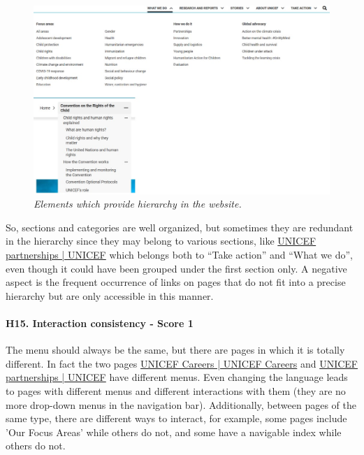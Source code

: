 \begin{figure}[!h]
	\begin{center}
		\includegraphics[width=\textwidth]{FinalScores18.jpg}
		\captionsetup{font=small}
		\caption{\textit{Elements which provide hierarchy in the website.}}
	\end{center}
\end{figure}
\newline
So, sections and categories are well organized, but sometimes they are redundant in the hierarchy since they may belong to various sections, like \href{https://www.unicef.org/partnerships}{UNICEF partnerships | UNICEF} which belongs both to “Take action” and “What we do”, even though it could have been grouped under the first section only. 
\newline A negative aspect is the frequent occurrence of links on pages that do not fit into a precise hierarchy but are only accessible in this manner.
\newline
\newline \paragraph{H15. Interaction consistency - Score 1}	\label{subsec:H15}The menu should always be the same, but there are pages in which it is totally different. In fact the two pages \href{https://www.unicef.org/careers/}{UNICEF Careers | UNICEF Careers} and \href{https://www.unicef.org/partnerships}{UNICEF partnerships | UNICEF} have different menus. Even changing the language leads to pages with different menus and different interactions with them (they are no more drop-down menus in the navigation bar).
\newline Additionally, between pages of the same type, there are different ways to interact, for example, some pages include 'Our Focus Areas' while others do not, and some have a navigable index while others do not.
